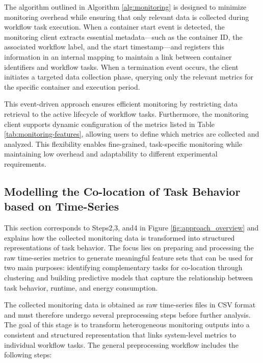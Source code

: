 The algorithm outlined in Algorithm \ref{alg:monitoring} is designed to minimize monitoring overhead while ensuring that only relevant data is collected during workflow task execution. When a container start event is detected, the monitoring client extracts essential metadata—such as the container ID, the associated workflow label, and the start timestamp—and registers this information in an internal mapping to maintain a link between container identifiers and workflow tasks. When a termination event occurs, the client initiates a targeted data collection phase, querying only the relevant metrics for the specific container and execution period.

This event-driven approach ensures efficient monitoring by restricting data retrieval to the active lifecycle of workflow tasks. Furthermore, the monitoring client supports dynamic configuration of the metrics listed in Table \ref{tab:monitoring-features}, allowing users to define which metrics are collected and analyzed. This flexibility enables fine-grained, task-specific monitoring while maintaining low overhead and adaptability to different experimental requirements.

\subsection{Modelling the Co-location of Task Behavior based on Time-Series}
\label{sec:data_analysis}

This section corresponds to Steps2,3, and4 in Figure \ref{fig:approach_overview} and explains how the collected monitoring data is transformed into structured representations of task behavior. The focus lies on preparing and processing the raw time-series metrics to generate meaningful feature sets that can be used for two main purposes: identifying complementary tasks for co-location through clustering and building predictive models that capture the relationship between task behavior, runtime, and energy consumption.

\label{sec:data_preprocessing_general}

The collected monitoring data is obtained as raw time-series files in CSV format and must therefore undergo several preprocessing steps before further analysis. The goal of this stage is to transform heterogeneous monitoring outputs into a consistent and structured representation that links system-level metrics to individual workflow tasks. The general preprocessing workflow includes the following steps:

